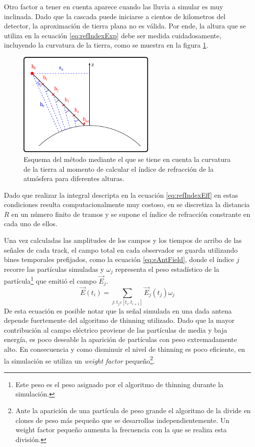 		Otro factor a tener en cuenta aparece cuando las lluvia a simular es muy inclinada.
		Dado que la cascada puede iniciarse a cientos de kilometros del detector, la aproximaci\'on de tierra plana no es v\'alida.
		Por ende, la altura que se utiliza en la ecuaci\'on \ref{eq:refIndexExp} debe ser medida cuidadosamente, incluyendo la curvatura de la tierra, como se muestra en la figura \ref{fig:refIndex}.
		\begin{figure}[ht!]
		\centering
			\includegraphics[width=0.6\textwidth]{fig/simulacionRadio/refIndex}
			\caption{\label{fig:refIndex} Esquema del m\'etodo mediante el que se tiene en cuenta la curvatura de la tierra al momento de calcular el \'indice de refracci\'on de la atm\'osfera para diferentes alturas.}
		\end{figure}
		Dado que realizar la integral descripta en la ecuaci\'on \ref{eq:refIndexEff} en estas condiciones resulta computacionalmente muy costoso, en \zhs{} se discretiza la distancia $R$ en un n\'umero finito de tramos y se supone el \'indice de refracci\'on constrante en cada uno de ellos.
		
		Una vez calculadas las amplitudes de los campos y los tiempos de arribo de las se\~nales de cada track, el campo total en cada observador se guarda utilizando bines temporales prefijados, como la ecuaci\'on \ref{eq:eAntField}, donde el \'indice $j$ recorre las part\'iculas simuladas y $\omega_j$ representa el peso estad\'istico de la part\'icula\footnote{Este peso es el peso asignado por el algoritmo de thinning durante la simulaci\'on.} que emiti\'o el campo $\vec{E}_j$.
		\begin{equation}
		\vec{E}(t_i)=\sum_{j:t_j\varepsilon[t_i,t_{i+1}]}\vec{E}_j(t_j)\omega_j
		\label{eq:eAntField}
		\end{equation}
		De esta ecuaci\'on es posible notar que la se\~nal simulada en una dada antena depende fuertemente del algoritmo de thinning utilizado. 
		Dado que la mayor contribuci\'on al campo el\'ectrico proviene de las part\'iculas de media y baja energ\'ia, es poco deseable la aparici\'on de partículas con peso extremadamente alto.
		En consecuencia y como disminuir el nivel de thinning es poco eficiente, en la simulación se utiliza un \emph{weight factor} peque\~no\footnote{Ante la aparici\'on de una part\'icula de peso grande el algoritmo de \aires{} la divide en clones de peso m\'as peque\~no que se desarrollas independientemente. Un weight factor peque\~no aumenta la frecuencia con la que se realiza esta divisi\'on.}.
		

